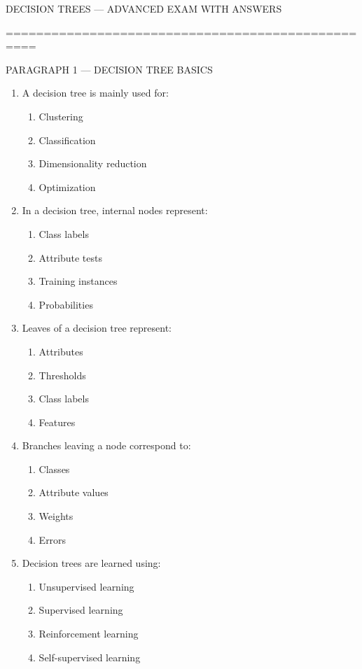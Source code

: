 \documentclass[3pt]{article}
\begin{document}
	
	DECISION TREES — ADVANCED EXAM WITH ANSWERS
	
\vspace{0.3em}

	==================================================
	
	PARAGRAPH 1 — DECISION TREE BASICS
	
	\begin{enumerate}
		\item A decision tree is mainly used for:
		\begin{enumerate}
			\item Clustering
			\item Classification
			\item Dimensionality reduction
			\item Optimization
		\end{enumerate}
		
		\item In a decision tree, internal nodes represent:
		\begin{enumerate}
			\item Class labels
			\item Attribute tests
			\item Training instances
			\item Probabilities
		\end{enumerate}
		
		\item Leaves of a decision tree represent:
		\begin{enumerate}
			\item Attributes
			\item Thresholds
			\item Class labels
			\item Features
		\end{enumerate}
		
		\item Branches leaving a node correspond to:
		\begin{enumerate}
			\item Classes
			\item Attribute values
			\item Weights
			\item Errors
		\end{enumerate}
		
		\item Decision trees are learned using:
		\begin{enumerate}
			\item Unsupervised learning
			\item Supervised learning
			\item Reinforcement learning
			\item Self-supervised learning
		\end{enumerate}
		

\end{enumerate}
\end{document}
